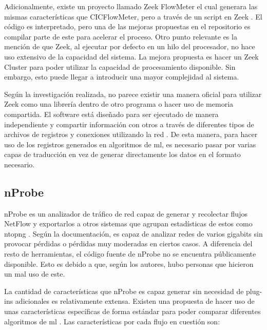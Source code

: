 Adicionalmente, existe un proyecto llamado Zeek FlowMeter el cual generara las mismas características que CICFlowMeter, pero a través de un script en Zeek \cite{zeek_flowmeter}. El código es interpretado, pero una de las mejoras propuestas en el repositorio es compilar parte de este para acelerar el proceso. Otro punto relevante es la mención de que Zeek, al ejecutar por defecto en un hilo del procesador, no hace uso extensivo de la capacidad del sistema. La mejora propuesta es hacer un Zeek Cluster \cite{zeek_documentation_cluster} para poder utilizar la capacidad de procesamiento disponible. Sin embargo, esto puede llegar a introducir una mayor complejidad al sistema.

Según la investigación realizada, no parece existir una manera oficial para utilizar Zeek como una librería dentro de otro programa o hacer uso de memoria compartida. El software está diseñado para ser ejecutado de manera independiente y compartir información con otros a través de diferentes tipos de archivos de registros \cite{zeek_documentation_logging} y conexiones utilizando la red \cite{zeek_documentation_logwriters}. De esta manera, para hacer uso de los registros generados en algoritmos de \gls{ml}, es necesario pasar por varias capas de traducción en vez de generar directamente los datos en el formato necesario.

\subsection{nProbe}

nProbe es un analizador de tráfico de red capaz de generar y recolectar flujos NetFlow y exportarlos a otros sistemas que agrupan estadísticas de estos como ntopng \cite{nprobe_documentation}. Según la documentación, es capaz de analizar redes de varios gigabits sin provocar pérdidas o pérdidas muy moderadas en ciertos casos. A diferencia del resto de herramientas, el código fuente de nProbe no se encuentra públicamente disponible. Esto es debido a que, según los autores, hubo personas que hicieron un mal uso de este. 

La cantidad de características que nProbe es capaz generar sin necesidad de plug-ins adicionales es relativamente extensa. Existen una propuesta de hacer uso de unas características específicas de forma estándar para poder comparar diferentes algoritmos de \gls{ml} \cite{DBLP:journals/corr/abs-2101-11315}. Las características por cada flujo en cuestión son:

